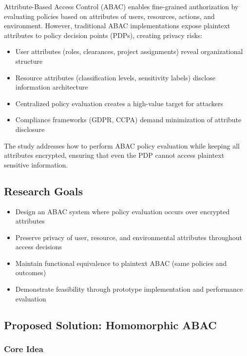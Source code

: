 Attribute-Based Access Control (ABAC) enables fine-grained authorization by evaluating policies based on attributes of users, resources, actions, and environment. However, traditional ABAC implementations expose plaintext attributes to policy decision points (PDPs), creating privacy risks:

\begin{itemize}
    \item User attributes (roles, clearances, project assignments) reveal organizational structure
    \item Resource attributes (classification levels, sensitivity labels) disclose information architecture
    \item Centralized policy evaluation creates a high-value target for attackers
    \item Compliance frameworks (GDPR, CCPA) demand minimization of attribute disclosure
\end{itemize}

The study addresses how to perform ABAC policy evaluation while keeping all attributes encrypted, ensuring that even the PDP cannot access plaintext sensitive information.

\subsection{Research Goals}

\begin{itemize}
    \item Design an ABAC system where policy evaluation occurs over encrypted attributes
    \item Preserve privacy of user, resource, and environmental attributes throughout access decisions
    \item Maintain functional equivalence to plaintext ABAC (same policies and outcomes)
    \item Demonstrate feasibility through prototype implementation and performance evaluation
\end{itemize}

\subsection{Proposed Solution: Homomorphic ABAC}

\subsubsection{Core Idea}

